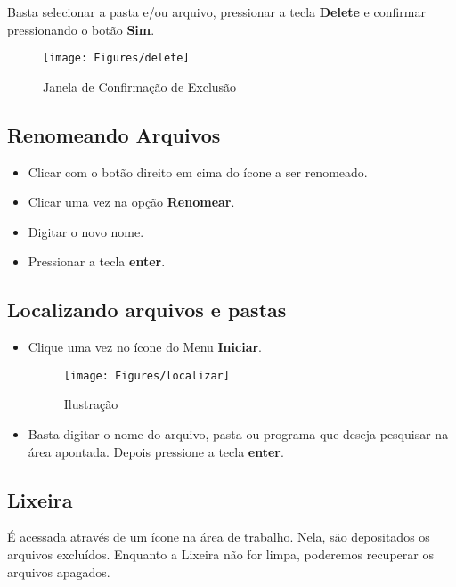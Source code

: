 \documentclass[hidelinks,12pt]{article}
\begin{document}
		Basta selecionar a pasta e/ou arquivo, pressionar a tecla {\bf Delete} e confirmar pressionando o botão {\bf Sim}.

			\begin{figure}[!h]
				\centering
				\texttt{[image: Figures/delete]}
				\caption{Janela de Confirmação de Exclusão}
				\label{fig:delete}
			\end{figure}

		\subsection{Renomeando Arquivos}

		\begin{itemize}
			\item Clicar com o botão direito em cima do ícone a ser renomeado.
			\item Clicar uma vez na opção {\bf Renomear}.
			\item Digitar o novo nome.
			\item Pressionar a tecla {\bf enter}.
		\end{itemize}

		\subsection{Localizando arquivos e pastas}

		\begin{itemize}
			\item Clique uma vez no ícone do Menu {\bf Iniciar}.

			\begin{figure}[!h]
				\centering
				\texttt{[image: Figures/localizar]}
				\caption{Ilustração}
				\label{fig:localizar}
			\end{figure}

			\item  Basta digitar o nome do arquivo, pasta ou programa que deseja pesquisar na área apontada. Depois pressione a tecla {\bf enter}.
		\end{itemize}

		\subsection{Lixeira}

		É acessada através de um ícone na área de trabalho. Nela, são depositados os arquivos excluídos. Enquanto a Lixeira não for limpa, poderemos recuperar os arquivos apagados.
\end{document}
